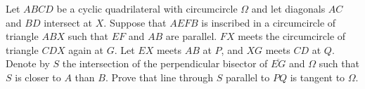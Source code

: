 Let $ABCD$ be a cyclic quadrilateral with circumcircle $\Omega$ and let diagonals $AC$ and $BD$ intersect at $X$. Suppose that $AEFB$ is inscribed in a circumcircle of triangle $ABX$ such that $EF$ and $AB$ are parallel. $FX$ meets the circumcircle of triangle $CDX$ again at $G$. Let $EX$ meets $AB$ at $P$, and $XG$ meets $CD$ at $Q$. Denote by $S$ the intersection of the perpendicular bisector of $\overline{EG}$ and $\Omega$ such that $S$ is closer to $A$ than $B$. Prove that line through $S$ parallel to $PQ$ is tangent to $\Omega$.